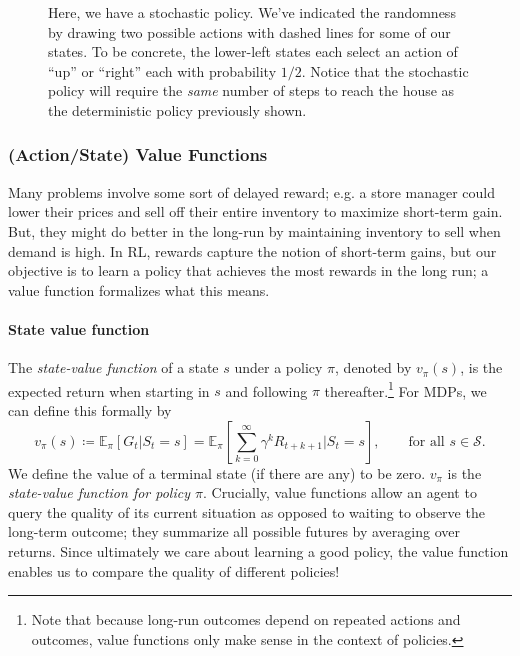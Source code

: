\documentclass[12pt]{article}
\begin{document}
\begin{figure}[h]
  \centering
  \caption{\footnotesize Here, we have a stochastic policy. We've indicated the randomness by drawing two possible actions with dashed lines for some of our states. To be concrete, the lower-left states each select an action of ``up'' or ``right'' each with probability $1/2$. Notice that the stochastic policy will require the \emph{same} number of steps to reach the house as the deterministic policy previously shown.}
\end{figure}

\subsubsection{(Action/State) Value Functions}
Many problems involve some sort of delayed reward; e.g. a store manager could lower their prices and sell off their entire inventory to maximize short-term gain. But, they might do better in the long-run by maintaining inventory to sell when demand is high. In RL, rewards capture the notion of short-term gains, but our objective is to learn a policy that achieves the most rewards in the long run; a value function formalizes what this means.

\paragraph{State value function}
The \emph{state-value function} of a state $s$ under a policy $\pi$, denoted by $v_\pi(s)$, is the expected return when starting in $s$ and following $\pi$ thereafter.\footnote{Note that because long-run outcomes depend on repeated actions and outcomes, value functions only make sense in the context of policies.} For MDPs, we can define this formally by
\begin{equation}
  \label{eq: statevalueforpolicypi}
  v_\pi(s) \coloneqq \mathbb E_{\pi} \left[ G_t | S_t = s \right] = \mathbb E_\pi \left[ \sum_{k=0}^{\infty} \gamma^k R_{t+k+1} | S_t = s \right], \hspace{24pt} \textrm{for all } s \in \mathcal S.
\end{equation}
We define the value of a terminal state (if there are any) to be zero. $v_\pi$ is the \emph{state-value function for policy $\pi$}. Crucially, value functions allow an agent to query the quality of its current situation as opposed to waiting to observe the long-term outcome; they summarize all possible futures by averaging over returns. Since ultimately we care about learning a good policy, the value function enables us to compare the quality of different policies!
\end{document}
